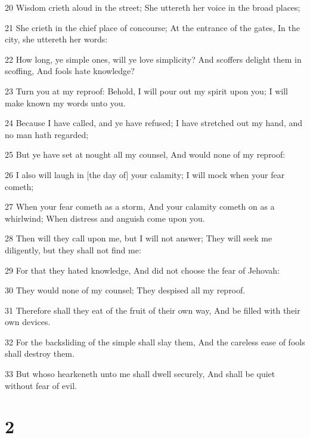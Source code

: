 \par 20 Wisdom crieth aloud in the street; She uttereth her voice in the broad places;
\par 21 She crieth in the chief place of concourse; At the entrance of the gates, In the city, she uttereth her words:
\par 22 How long, ye simple ones, will ye love simplicity? And scoffers delight them in scoffing, And fools hate knowledge?
\par 23 Turn you at my reproof: Behold, I will pour out my spirit upon you; I will make known my words unto you.
\par 24 Because I have called, and ye have refused; I have stretched out my hand, and no man hath regarded;
\par 25 But ye have set at nought all my counsel, And would none of my reproof:
\par 26 I also will laugh in [the day of] your calamity; I will mock when your fear cometh;
\par 27 When your fear cometh as a storm, And your calamity cometh on as a whirlwind; When distress and anguish come upon you.
\par 28 Then will they call upon me, but I will not answer; They will seek me diligently, but they shall not find me:
\par 29 For that they hated knowledge, And did not choose the fear of Jehovah:
\par 30 They would none of my counsel; They despised all my reproof.
\par 31 Therefore shall they eat of the fruit of their own way, And be filled with their own devices.
\par 32 For the backsliding of the simple shall slay them, And the careless ease of fools shall destroy them.
\par 33 But whoso hearkeneth unto me shall dwell securely, And shall be quiet without fear of evil.

\chapter{2}

